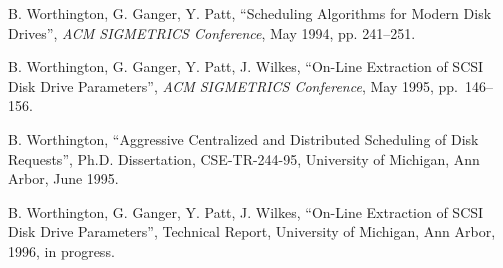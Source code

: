 \begin{thebibliography}{99}



B. Worthington, G. Ganger, Y. Patt,
``Scheduling Algorithms for Modern Disk Drives'',
{\it ACM SIGMETRICS Conference},
May 1994, pp. 241--251.


B. Worthington, G. Ganger, Y. Patt, J. Wilkes,
``On-Line Extraction of SCSI Disk Drive Parameters'',
{\it ACM SIGMETRICS Conference},
May 1995, \mbox{pp. 146--156}.

B. Worthington,
``Aggressive Centralized and Distributed Scheduling of Disk Requests'',
Ph.D. Dissertation, CSE-TR-244-95, University of Michigan, Ann Arbor,
June 1995.

B. Worthington, G. Ganger, Y. Patt, J. Wilkes,
``On-Line Extraction of SCSI Disk Drive Parameters'',
Technical Report, University of Michigan, Ann Arbor,
1996, in progress.



\clearpage

\end{thebibliography}

